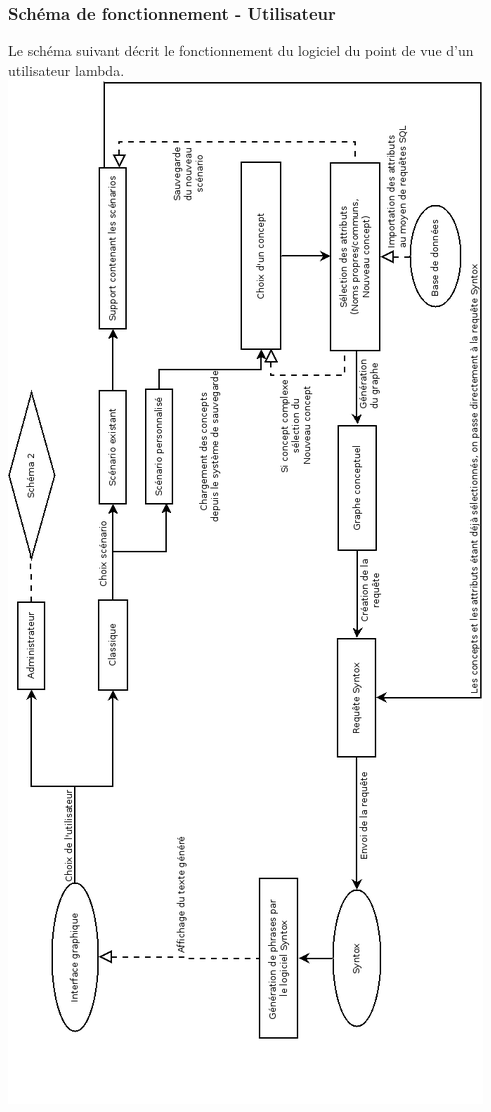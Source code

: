 \documentclass[12pt]{report}
\begin{document}
	\subsubsection{Schéma de fonctionnement - Utilisateur}
	Le schéma suivant décrit le fonctionnement du logiciel du point de vue d'un utilisateur lambda.
	\includegraphics[scale=0.45]{FonctionnementUtilisateur.png}
	
\end{document}
